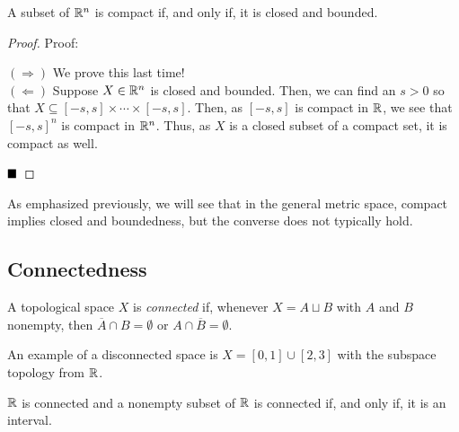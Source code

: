 \begin{lemma}
    A subset of $\mathbb{R}^n$ is compact if, and only if, it is closed and bounded.
\end{lemma}
\begin{proof}{Proof:}

    $(\Rightarrow)$ We prove this last time!\\

    $(\Leftarrow)$ Suppose $X \in \mathbb{R}^n$ is closed and bounded. Then, we can find an $s > 0$ so that $X \subseteq [-s, s] \times \cdots \times [-s, s]$. Then, as $[-s, s]$ is compact in $\mathbb{R}$, we see that $[-s, s]^{n}$ is compact in $\mathbb{R}^n$. Thus, as $X$ is a closed subset of a compact set, it is compact as well.

    $\qed$
\end{proof}
As emphasized previously, we will see that in the general metric space, compact implies closed and boundedness, but the converse does not typically hold.

\subsection*{Connectedness}
\sectionspace

\begin{definition}
    A topological space $X$ is \emph{connected} if, whenever $X = A \sqcup B$ with $A$ and $B$ nonempty, then $\overline{A} \cap B = \emptyset$ or $A \cap \overline{B} = \emptyset$. 
\end{definition}

An example of a disconnected space is $X = [0, 1] \cup [2, 3]$ with the subspace topology from $\mathbb{R}$.\\

\begin{lemma}
    $\mathbb{R}$ is connected and a nonempty subset of $\mathbb{R}$ is connected if, and only if, it is an interval.
\end{lemma}

